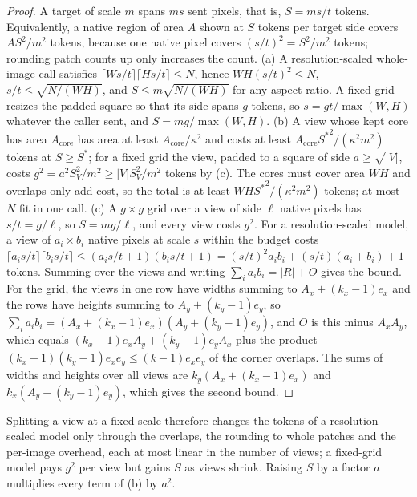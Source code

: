 \begin{proof}
A target of scale $m$ spans $ms$ sent pixels, that is, $S = ms/t$ tokens. Equivalently, a native region of area $A$ shown at $S$ tokens per target side covers $AS^2/m^2$ tokens, because one native pixel covers $(s/t)^2 = S^2/m^2$ tokens; rounding patch counts up only increases the count.
(a) A resolution-scaled whole-image call satisfies $\lceil Ws/t\rceil\lceil Hs/t\rceil \le N$, hence $WH(s/t)^2 \le N$, $s/t \le \sqrt{N/(WH)}$, and $S \le m\sqrt{N/(WH)}$ for any aspect ratio. A fixed grid resizes the padded square so that its side spans $g$ tokens, so $s = gt/\max(W,H)$ whatever the caller sent, and $S = mg/\max(W,H)$.
(b) A view whose kept core has area $A_{\mathrm{core}}$ has area at least $A_{\mathrm{core}}/\kappa^2$ and costs at least $A_{\mathrm{core}}{S^\ast}^2/(\kappa^2m^2)$ tokens at $S \ge S^\ast$; for a fixed grid the view, padded to a square of side $a \ge \sqrt{|V|}$, costs $g^2 = a^2 S_V^2/m^2 \ge |V| S_V^2/m^2$ tokens by (c). The cores must cover area $WH$ and overlaps only add cost, so the total is at least $WH{S^\ast}^2/(\kappa^2 m^2)$ tokens; at most $N$ fit in one call.
(c) A $g \times g$ grid over a view of side $\ell$ native pixels has $s/t = g/\ell$, so $S = mg/\ell$, and every view costs $g^2$. For a resolution-scaled model, a view of $a_i \times b_i$ native pixels at scale $s$ within the budget costs $\lceil a_is/t\rceil\lceil b_is/t\rceil \le (a_is/t + 1)(b_is/t + 1) = (s/t)^2a_ib_i + (s/t)(a_i + b_i) + 1$ tokens. Summing over the views and writing $\sum_i a_ib_i = |R| + O$ gives the bound. For the grid, the views in one row have widths summing to $A_x + (k_x - 1)e_x$ and the rows have heights summing to $A_y + (k_y - 1)e_y$, so $\sum_i a_ib_i = (A_x + (k_x-1)e_x)(A_y + (k_y-1)e_y)$, and $O$ is this minus $A_xA_y$, which equals $(k_x-1)e_xA_y + (k_y-1)e_yA_x$ plus the product $(k_x-1)(k_y-1)e_xe_y \le (k-1)e_xe_y$ of the corner overlaps. The sums of widths and heights over all views are $k_y(A_x + (k_x-1)e_x)$ and $k_x(A_y + (k_y-1)e_y)$, which gives the second bound.
\end{proof}

Splitting a view at a fixed scale therefore changes the tokens of a resolution-scaled model only through the overlaps, the rounding to whole patches and the per-image overhead, each at most linear in the number of views; a fixed-grid model pays $g^2$ per view but gains $S$ as views shrink. Raising $S$ by a factor $a$ multiplies every term of (b) by $a^2$.

